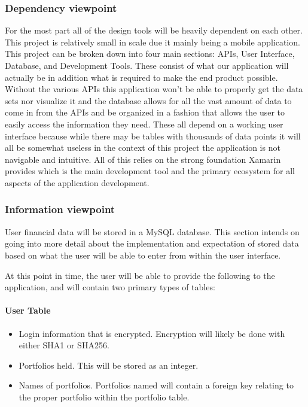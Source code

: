 \documentclass[onecolumn, draftclsnofoot,10pt, compsoc]{IEEEtran}
\begin{document}
\subsubsection{Dependency viewpoint}

      For the most part all of the design tools will be heavily dependent on each other. This project is relatively small in scale due it mainly being a mobile application. This project can be broken down into four main
      sections: APIs, User Interface, Database, and Development Tools. These consist of what our application will actually be in addition what is required to make the end product possible. Without the various APIs this
      application won't be able to properly get the data sets nor visualize it and the database allows for all the vast amount of data to come in from the APIs and be organized in a fashion that allows the user to easily access the
      information they need. These all depend on a working user interface because while there may be tables with thousands of data points it will all be somewhat useless in the context of this project the application is not
      navigable and intuitive. All of this relies on the strong foundation Xamarin provides which is the main development tool and the primary ecosystem for all aspects of the application development. 

\subsubsection{Information viewpoint}

        User financial data will be stored in a MySQL database. This section intends on going into more detail
        about the implementation and expectation of stored
        data based on what the user will be able to enter from within the user interface.

        At this point in time, the user will be able to provide the following to the application, and will contain two primary types of tables:

\paragraph{User Table}
\begin{itemize}
    \item Login information that is encrypted. Encryption will likely be done with either SHA1 or SHA256.
    \item Portfolios held. This will be stored as an integer.
    \item Names of portfolios. Portfolios named will contain a foreign key relating to the proper portfolio within the portfolio table.
\end{itemize}
\end{document}
